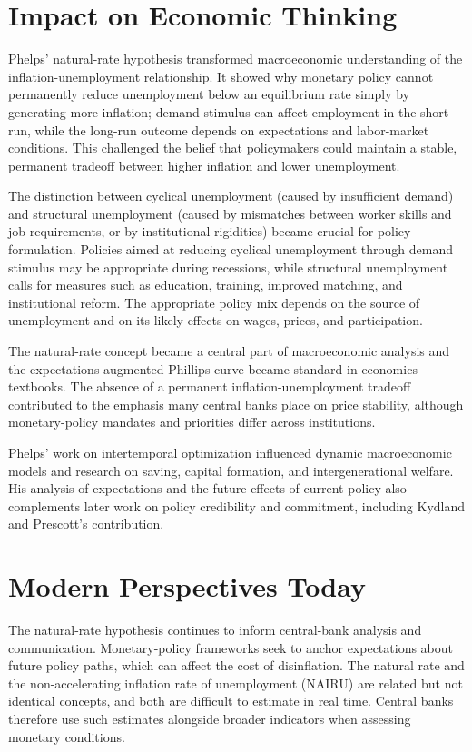 \section{Impact on Economic Thinking}
Phelps' natural-rate hypothesis transformed macroeconomic understanding of the
inflation-unemployment relationship. It showed why monetary policy cannot
permanently reduce unemployment below an equilibrium rate simply by generating
more inflation; demand stimulus can affect employment in the short run, while
the long-run outcome depends on expectations and labor-market conditions. This
challenged the belief that policymakers could maintain a stable, permanent
tradeoff between higher inflation and lower unemployment.

The distinction between cyclical unemployment (caused by insufficient demand)
and structural unemployment (caused by mismatches between worker skills and
job requirements, or by institutional rigidities) became crucial for policy
formulation. Policies aimed at reducing cyclical unemployment through demand
stimulus may be appropriate during recessions, while structural unemployment
calls for measures such as education, training, improved matching, and
institutional reform. The appropriate policy mix depends on the source of
unemployment and on its likely effects on wages, prices, and participation.

The natural-rate concept became a central part of macroeconomic analysis and the
expectations-augmented Phillips curve became standard in economics textbooks.
The absence of a permanent inflation-unemployment tradeoff contributed to the
emphasis many central banks place on price stability, although monetary-policy
mandates and priorities differ across institutions.

Phelps' work on intertemporal optimization influenced dynamic macroeconomic
models and research on saving, capital formation, and intergenerational welfare.
His analysis of expectations and the future effects of current policy also
complements later work on policy credibility and commitment, including Kydland
and Prescott's contribution.

\section{Modern Perspectives Today}
The natural-rate hypothesis continues to inform central-bank analysis and
communication. Monetary-policy frameworks seek to anchor expectations about
future policy paths, which can affect the cost of disinflation. The natural rate
and the non-accelerating inflation rate of unemployment (NAIRU) are related but
not identical concepts, and both are difficult to estimate in real time. Central
banks therefore use such estimates alongside broader indicators when assessing
monetary conditions.


